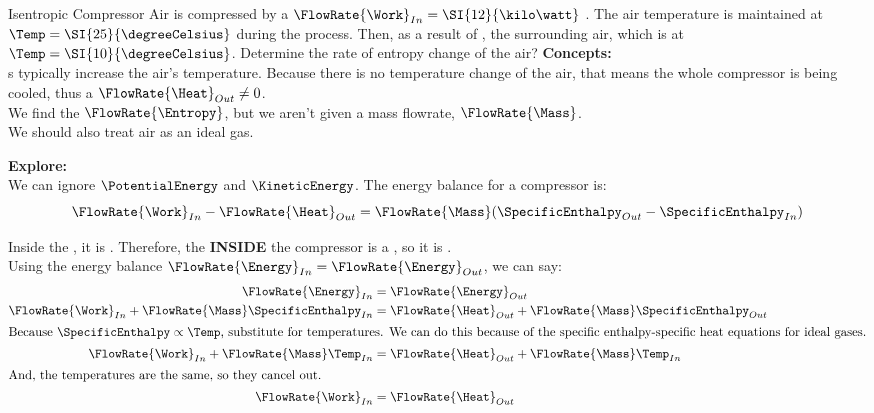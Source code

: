 \begin{example}{Isentropic Compressor}
  Air is compressed by a $\FlowRate{\Work}_{In} = \SI{12}{\kilo\watt}$ .
  The air temperature is maintained at $\Temp = \SI{25}{\degreeCelsius}$ during the process.
  Then, as a result of , the surrounding air, which is at $\Temp = \SI{10}{\degreeCelsius}$.
  Determine the rate of entropy change of the air?
  \tcblower{}
  \textbf{Concepts:} \\
  s typically increase the air's temperature.
  Because there is no temperature change of the air, that means the whole compressor is being cooled, thus a $\FlowRate{\Heat}_{Out} \neq 0$. \\
  We find the $\FlowRate{\Entropy}$, but we aren't given a mass flowrate, $\FlowRate{\Mass}$. \\
  We should also treat air as an ideal gas.

  \textbf{Explore:} \\
  We can ignore $\PotentialEnergy$ and $\KineticEnergy$.
  The energy balance for a compressor is:
  \begin{equation*}
    \FlowRate{\Work}_{In} - \FlowRate{\Heat}_{Out} = \FlowRate{\Mass} (\SpecificEnthalpy_{Out} - \SpecificEnthalpy_{In})
  \end{equation*}

  Inside the , it is .
  Therefore, the  \textbf{INSIDE} the compressor is a , so it is . \\
  Using the energy balance $\FlowRate{\Energy}_{In} = \FlowRate{\Energy}_{Out}$, we can say:
  \begin{align*}
    \FlowRate{\Energy}_{In} &= \FlowRate{\Energy}_{Out} \\
    \FlowRate{\Work}_{In} + \FlowRate{\Mass} \SpecificEnthalpy_{In} &= \FlowRate{\Heat}_{Out} + \FlowRate{\Mass} \SpecificEnthalpy_{Out} \\
    \intertext{Because $\SpecificEnthalpy \propto \Temp$, substitute for temperatures.
    We can do this because of the specific enthalpy-specific heat equations for ideal gases.}
    \FlowRate{\Work}_{In} + \FlowRate{\Mass} \Temp_{In} &= \FlowRate{\Heat}_{Out} + \FlowRate{\Mass} \Temp_{In} \\
    \intertext{And, the temperatures are the same, so they cancel out.}
    \FlowRate{\Work}_{In} &= \FlowRate{\Heat}_{Out}
  \end{align*}


\end{example}
